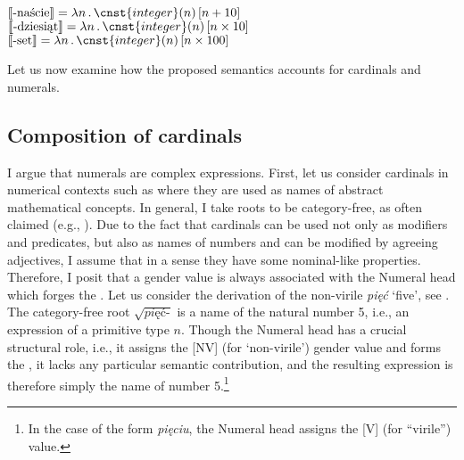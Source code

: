 \documentclass[output=paper, newtxmath, colorlinks, citecolor=brown]{langsci/langscibook}
\begin{document}
	\ea \label{ex:cardinal-suffixes-semantics} \ea $\llbracket \text{-naście}\rrbracket = \lambda n\,.\,\cnst{integer}(n)\,[n+10]$\label{ex:cardinal-suffixes-teen}
\ex $\llbracket \text{-dziesiąt}\rrbracket = \lambda n\,.\,\cnst{integer}(n)\,[n\times 10]$\label{ex:cardinal-suffixes-ty}
\ex $\llbracket \text{-set}\rrbracket = \lambda n\,.\,\cnst{integer}(n)\,[n\times 100]$\label{ex:cardinal-suffixes-hundred}
	\z
    \z

\begin{multicols}{2}
	\ea \label{ex:cardinal-suffixes-integers} \columnbreak
	\z
    \z
\end{multicols}

\noindent Let us now examine how the proposed semantics accounts for  cardinals and  numerals.

	\subsection{Composition of cardinals}\label{sec:composition-of-cardinals}

I argue that   numerals are complex expressions. First, let us consider cardinals in numerical contexts such as  where they are used as names of abstract mathematical concepts. In general, I take  roots to be category-free, as often claimed (e.g., \citealt{halle_marantz1993distributed}). Due to the fact that  cardinals can be used not only as modifiers and predicates, but also as names of numbers and can be modified by agreeing adjectives, I assume that in a sense they have some nominal-like properties. Therefore, I posit that a gender value is always associated with the Numeral head which forges the . Let us consider the derivation of the non-virile  \textit{pięć} `five', see . The category-free root $\sqrt{\textit{pięć-}}$ is a name of the natural number 5, i.e., an expression of a primitive type $n$. Though the Numeral head has a crucial structural role, i.e., it assigns the [NV] (for `non-virile') gender value and forms the , it lacks any particular semantic contribution, and the resulting expression  is therefore simply the name of number 5.\footnote{In the case of the form \textit{pięciu}, the Numeral head assigns the [V] (for ``virile'') value.}
\end{document}
